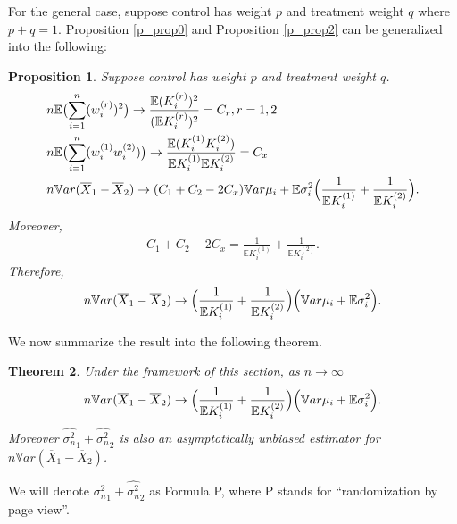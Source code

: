 \documentclass[10pt]{article}
\newcommand{\wht}{\widehat}
\newcommand{\var}{\ensuremath{\mathbb Var}}
\newcommand{\bbe}{\mathbb{E}}
\newcommand{\xbar}{\overline{X}}
\newcommand{\naiveest}{\wht{\sigma^2_n}}
\newtheorem{thm}{Theorem}
\newtheorem{prop}[thm]{Proposition}
\begin{document}
For the general case, suppose control has weight $p$ and treatment weight $q$ where $p+q=1$. Proposition \ref{p_prop0} and Proposition \ref{p_prop2} can be generalized into the following:
\begin{prop}\label{p_prop3}
Suppose control has weight $p$ and treatment weight $q$. 
\begin{align*}
&n\bbe \bigl (\sum_{i=1}^n (w_i^{(r)})^2\bigr)\to \frac{\bbe (K_i^{(r)})^2}{(\bbe K_i^{(r)})^2} = C_r, r=1,2\\
&n\bbe \bigl (\sum_{i=1}^n (w_i^{(1)}w_i^{(2)})\bigr)\to \frac{\bbe (K_i^{(1)}K_i^{(2)})}{\bbe K_i^{(1)}\bbe K_i^{(2)}} = C_x\\
&n\var(\xbar_1-\xbar_2) \to (C_1+C_2-2C_x) \var \mu_i + \bbe \sigma_i^2\Bigl(\frac{1 }{\bbe K_i^{(1)}}+\frac{1}{\bbe K_i^{(2)}}\Bigr).
\end{align*}
Moreover, 
\begin{align*}
C_1+C_2-2C_x = \frac{1 }{\bbe K_i^{(1)}}+\frac{1}{\bbe K_i^{(2)}}.
\end{align*}
Therefore, 
\begin{align*}
n\var(\xbar_1-\xbar_2) \to \Bigl(\frac{1 }{\bbe K_i^{(1)}}+\frac{1}{\bbe K_i^{(2)}}\Bigr) \Bigl( \var \mu_i + \bbe \sigma_i^2\Bigr).
\end{align*}
\end{prop}

We now summarize the result into the following theorem.
\begin{thm}\label{p_thm1}
Under the framework of this section, as $n\to\infty$
\begin{align*}
n\var(\xbar_1-\xbar_2) \to \Bigl(\frac{1 }{\bbe K_i^{(1)}}+\frac{1}{\bbe K_i^{(2)}}\Bigr) \Bigl( \var \mu_i + \bbe \sigma_i^2\Bigr).
\end{align*}
Moreover $\naiveest_1+\naiveest_2$ is also an asymptotically unbiased estimator for $n\var(\xbar_1-\xbar_2)$.
\end{thm}

We will denote $\naiveest_1+\naiveest_2$ as Formula P, where P stands for ``randomization by page view''.
\end{document}
